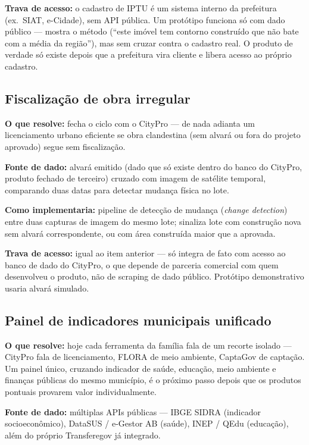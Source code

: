 \documentclass[11pt,a4paper]{article}
\begin{document}
\textbf{Trava de acesso:} o cadastro de IPTU é um sistema interno da prefeitura (ex.\ SIAT,
e-Cidade), sem API pública. Um protótipo funciona só com dado público --- mostra o método
(``este imóvel tem contorno construído que não bate com a média da região''), mas sem cruzar
contra o cadastro real. O produto de verdade só existe depois que a prefeitura vira cliente e
libera acesso ao próprio cadastro.

\subsection{Fiscalização de obra irregular}

\textbf{O que resolve:} fecha o ciclo com o CityPro --- de nada adianta um licenciamento
urbano eficiente se obra clandestina (sem alvará ou fora do projeto aprovado) segue sem
fiscalização.

\textbf{Fonte de dado:} alvará emitido (dado que só existe dentro do banco do CityPro,
produto fechado de terceiro) cruzado com imagem de satélite temporal, comparando duas datas
para detectar mudança física no lote.

\textbf{Como implementaria:} pipeline de detecção de mudança (\emph{change detection}) entre
duas capturas de imagem do mesmo lote; sinaliza lote com construção nova sem alvará
correspondente, ou com área construída maior que a aprovada.

\textbf{Trava de acesso:} igual ao item anterior --- só integra de fato com acesso ao banco
de dado do CityPro, o que depende de parceria comercial com quem desenvolveu o produto, não
de scraping de dado público. Protótipo demonstrativo usaria alvará simulado.

\subsection{Painel de indicadores municipais unificado}

\textbf{O que resolve:} hoje cada ferramenta da família fala de um recorte isolado --- CityPro
fala de licenciamento, FLORA de meio ambiente, CaptaGov de captação. Um painel único, cruzando
indicador de saúde, educação, meio ambiente e finanças públicas do mesmo município, é o
próximo passo depois que os produtos pontuais provarem valor individualmente.

\textbf{Fonte de dado:} múltiplas APIs públicas --- IBGE SIDRA (indicador socioeconômico),
DataSUS / e-Gestor AB (saúde), INEP / QEdu (educação), além do próprio Transferegov já
integrado.
\end{document}
